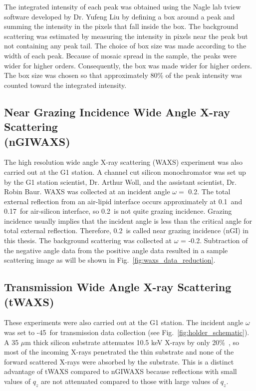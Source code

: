 The integrated intensity of each peak was obtained using the Nagle lab tview
software developed by Dr. Yufeng Liu \cite{Liu03} by defining a box around a
peak and summing the intensity in the pixels that fall inside the box.
The background scattering was estimated by measuring the intensity in pixels
near the peak but not containing any peak tail. The choice of box size was 
made according to the width of each peak. Because of mosaic spread in the sample,
the peaks were wider for higher orders. 
Consequently, the box was made wider for higher
orders. The box size was chosen so that approximately 80\% of the peak intensity
was counted toward the integrated intensity.

\subsection{Near Grazing Incidence Wide Angle X-ray Scattering\\ (nGIWAXS)}\label{sec:nGIWAXS_method}
The high resolution wide angle X-ray scattering (WAXS)
experiment was also carried out at the G1 station. 
A channel cut silicon monochromator was set up by the G1
station scientist, Dr. Arthur Woll, and the assistant scientist, Dr. Robin Baur.
WAXS was collected at an incident angle $\omega=$ 
0.2\textdegree. 
The total external reflection from an air-lipid interface occurs approximately 
at 0.1\textdegree\ and 0.17\textdegree\ for air-silicon interface, 
so 0.2\textdegree\ is not quite grazing incidence.
Grazing incidence usually implies that the incident angle is less than the 
critical angle for total external reflection.
Therefore, 0.2\textdegree\ is called near grazing incidence (nGI) in this thesis.
The background scattering was collected at $\omega$ = -0.2\textdegree. Subtraction
of the negative angle data from the positive angle data resulted in 
a sample scattering image as will be shown in 
Fig.~\ref{fig:waxs_data_reduction}.


\subsection{Transmission Wide Angle X-ray Scattering (tWAXS)}\label{sec:tWAXS_method}
These experiments were also carried out at the G1 station.
The incident angle $\omega$ was set to -45\textdegree\ for transmission data
collection (see Fig.~\ref{fig:holder_schematic}). 
A 35 $\mu$m thick silicon substrate attenuates 10.5 keV X-rays 
by only 20\%\ \cite{ref:cxro}, so most of the incoming X-rays penetrated
the thin substrate and none of the forward scattered X-rays were absorbed by the 
substrate.  This is a distinct advantage of tWAXS compared to nGIWAXS because 
reflections with small values of $q_z$ are not attenuated compared to those 
with large values of $q_z$.
 
